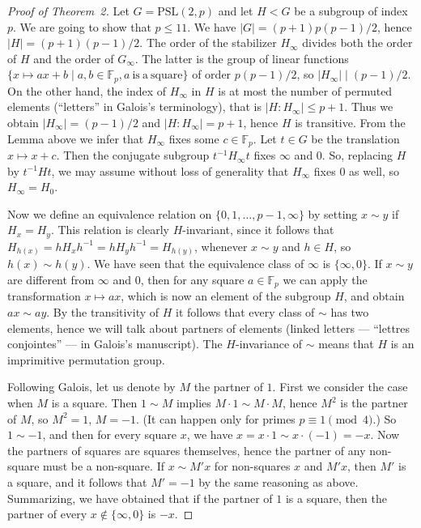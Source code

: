 \documentclass[reqno,12pt]{amsart}
\theoremstyle{definition}
\newcommand{\PSL}{\mathrm{PSL}}
\begin{document}
\begin{proof}[Proof of Theorem~2]
Let $G=\PSL(2,p)$ and let $H<G$ be a subgroup of index $p$. We are going to show that $p\le 11$.
We have $|G|=(p+1)p(p-1)/2$, hence $|H|=(p+1)(p-1)/2$.
The order of the stabilizer $H_\infty$ divides both the order of $H$ and the order of $G_\infty$.
The latter is the group of linear functions $\{x\mapsto ax+b\mid a,b\in\mathbb{F}_p, a\mathrm{\ is\ a\ square}\}$
of order $p(p-1)/2$, so $|H_\infty| \mid (p-1)/2$. On the other hand, the index of $H_\infty$
in $H$ is at most the number of permuted elements (``letters'' in Galois's terminology), that is
$|H:H_\infty|\le p+1$. Thus we obtain $|H_\infty|=(p-1)/2$ and $|H:H_\infty|=p+1$, hence
$H$ is transitive.
From the Lemma above we infer that
$H_\infty$ fixes some $c\in \mathbb{F}_p$. Let $t\in G$ be the translation $x\mapsto x+c$.
Then the conjugate subgroup $t^{-1}H_\infty t$ fixes $\infty$ and $0$. So, replacing $H$ by
$t^{-1}Ht$, we may assume without loss of
generality that $H_\infty$ fixes $0$ as well, so $H_\infty=H_0$.

Now we define an equivalence relation on $\{0,1,\dots,p-1,\infty\}$
by setting $x\sim y$ if $H_x=H_y$. This relation
is clearly $H$-invariant, since it follows that $H_{h(x)}=hH_xh^{-1}=hH_yh^{-1}=H_{h(y)}$, whenever
$x\sim y$ and $h\in H$, so $h(x)\sim h(y)$. We have seen that the equivalence class of $\infty$ is
$\{\infty,0\}$. If $x\sim y$ are different from $\infty$ and $0$, then for any square $a\in\mathbb{F}_p$
we can apply the transformation $x\mapsto ax$, which is now an element of the subgroup $H$,
and obtain $ax\sim ay$.
By the transitivity of $H$ it follows that every class of $\sim$ has two elements,
hence we will talk about partners of elements (linked letters --- ``lettres conjointes'' --- in Galois's manuscript).
The $H$-invariance of $\sim$ means that $H$ is an imprimitive permutation group.

Following Galois, let us denote by $M$ the partner of $1$. First we consider the case when
$M$ is a square. Then $1\sim M$ implies $M\cdot 1\sim M\cdot M$, hence $M^2$ is the partner of $M$,
so $M^2=1$, $M=-1$. (It can
happen only for primes $p\equiv 1\pmod 4$.) So $1\sim -1$, and then for every square $x$,
we have $x=x\cdot1\sim x\cdot(-1)=-x$. Now the partners of squares are squares themselves,
hence the partner of any non-square must be a non-square. If $x\sim M'x$ for non-squares $x$
and $M'x$, then $M'$ is a square, and it follows that
$M'=-1$ by the same reasoning as above. Summarizing, we
have obtained that if the partner of $1$ is a square, then the partner of every $x\notin\{\infty,0\}$ is
$-x$.


\end{proof}
\end{document}
